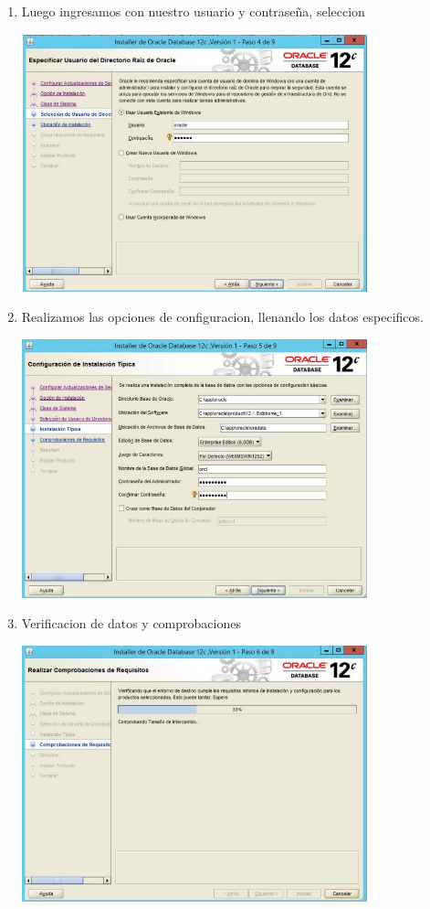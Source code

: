 \begin{enumerate}[1.]
\begin{center}
           \end{center}
	\hfill \break
	\hfill \break
	\hfill \break
	\hfill \break
	\hfill \break
	\hfill \break
	\hfill \break
	\hfill \break
	\hfill \break
	\hfill \break
	\hfill \break
	\hfill \break
          \item Luego ingresamos con nuestro usuario y contrase\~na, seleccion
 	\begin{center}
	\includegraphics[width=10cm]{./Imagenes/bran4} 
	\end{center}
	\item Realizamos las opciones de configuracion, llenando los datos especificos.
 	\begin{center}
	\includegraphics[width=10cm]{./Imagenes/bran5} 
	\end{center}
	\hfill \break
	\hfill \break
	\hfill \break
	\hfill \break
	\hfill \break
	\hfill \break
	\hfill \break
	\hfill \break
	\hfill \break
	\hfill \break
	\hfill \break
	\hfill \break
          \item Verificacion de datos y comprobaciones
 	\begin{center}
	\includegraphics[width=10cm]{./Imagenes/bran6} 

\end{center}
\end{enumerate}
